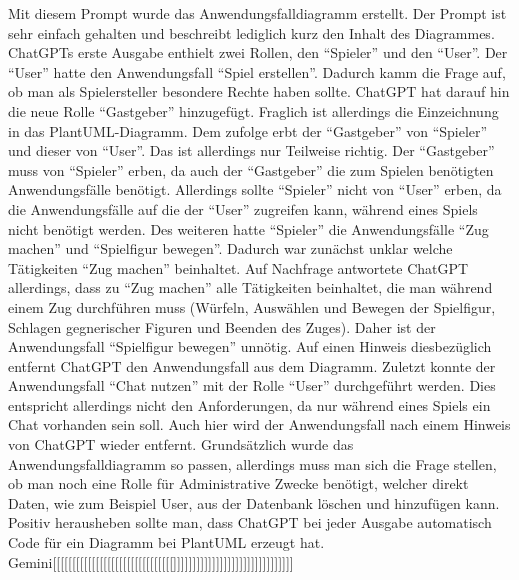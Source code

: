 Mit diesem Prompt wurde das Anwendungsfalldiagramm erstellt. Der Prompt ist sehr einfach gehalten und beschreibt lediglich kurz den Inhalt des Diagrammes.\\

ChatGPTs erste Ausgabe enthielt zwei Rollen, den ``Spieler'' und den ``User''. Der ``User'' hatte den Anwendungsfall ``Spiel erstellen''. Dadurch kamm die 
Frage auf, ob man als Spielersteller besondere Rechte haben sollte. ChatGPT hat darauf hin die neue Rolle ``Gastgeber'' hinzugefügt. Fraglich ist allerdings
die Einzeichnung in das PlantUML-Diagramm. Dem zufolge erbt der ``Gastgeber'' von ``Spieler'' und dieser von ``User''. Das ist allerdings nur Teilweise richtig.
Der ``Gastgeber'' muss von ``Spieler'' erben, da auch der ``Gastgeber'' die zum Spielen benötigten Anwendungsfälle benötigt. Allerdings sollte ``Spieler'' nicht 
von ``User'' erben, da die Anwendungsfälle auf die der ``User'' zugreifen kann, während eines Spiels nicht benötigt werden. Des weiteren hatte ``Spieler'' die 
Anwendungsfälle ``Zug machen'' und ``Spielfigur bewegen''. Dadurch war zunächst unklar welche Tätigkeiten ``Zug machen'' beinhaltet. Auf Nachfrage antwortete 
ChatGPT allerdings, dass zu ``Zug machen'' alle Tätigkeiten beinhaltet, die man während einem Zug durchführen muss (Würfeln, Auswählen und Bewegen der Spielfigur, 
Schlagen gegnerischer Figuren und Beenden des Zuges). Daher ist der Anwendungsfall ``Spielfigur bewegen'' unnötig. Auf einen Hinweis diesbezüglich entfernt ChatGPT 
den Anwendungsfall aus dem Diagramm. Zuletzt konnte der Anwendungsfall ``Chat nutzen'' mit der Rolle ``User'' durchgeführt werden. Dies entspricht allerdings nicht 
den Anforderungen, da nur während eines Spiels ein Chat vorhanden sein soll. Auch hier wird der Anwendungsfall nach einem Hinweis von ChatGPT wieder entfernt. 
Grundsätzlich wurde das Anwendungsfalldiagramm so passen, allerdings muss man sich die Frage stellen, ob man noch eine Rolle für Administrative Zwecke benötigt, 
welcher direkt Daten, wie zum Beispiel User, aus der Datenbank löschen und hinzufügen kann. Positiv herausheben sollte man, dass ChatGPT bei jeder Ausgabe 
automatisch Code für ein Diagramm bei PlantUML erzeugt hat.\\

Gemini[[[[[[[[[[[[[[[[[[[[[[[[[[[[[[[]]]]]]]]]]]]]]]]]]]]]]]]]]]]]]]\\

